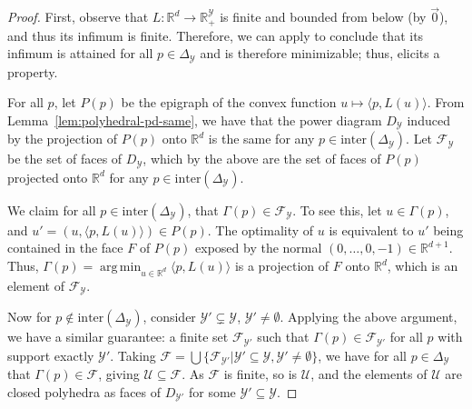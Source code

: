 \documentclass[11pt]{article}
\newcommand{\reals}{\mathbb{R}}
\newcommand{\simplex}{\Delta_\Y}
\newcommand{\F}{\mathcal{F}}
\newcommand{\U}{\mathcal{U}}
\newcommand{\Y}{\mathcal{Y}}
\newcommand{\inprod}[2]{\langle #1, #2 \rangle}%
\newcommand{\inter}{\mathrm{inter}}
\DeclareMathOperator*{\argmin}{arg\,min}
\begin{document}
\polyhedralrangegamma*
\begin{proof}
	First, observe that $L: \reals^d \to \reals^\Y_+$ is finite and bounded from below (by $\vec 0$), and thus its infimum is finite. 
	Therefore, we can apply \citet[Corollary 19.3.1]{rockafellar1997convex} to conclude that its infimum is attained for all $p \in \simplex$ and is therefore minimizable; thus, elicits a property.
	
	For all $p$, let $P(p)$ be the epigraph of the convex function $u\mapsto \inprod{p}{L(u)}$.
	From Lemma~\ref{lem:polyhedral-pd-same}, we have that the power diagram $D_\Y$ induced by the projection of $P(p)$ onto $\reals^d$ is the same for any $p\in\inter(\simplex)$.
	Let $\F_\Y$ be the set of faces of $D_\Y$, which by the above are the set of faces of $P(p)$ projected onto $\reals^d$ for any $p\in\inter(\simplex)$.
	
	We claim for all $p\in\inter(\simplex)$, that $\Gamma(p) \in \F_\Y$.
	To see this, let $u \in \Gamma(p)$, and $u' = (u,\inprod{p}{L(u)}) \in P(p)$.
	The optimality of $u$ is equivalent to $u'$ being contained in the face $F$ of $P(p)$ exposed by the normal $(0,\ldots,0,-1)\in\reals^{d+1}$.
	Thus, $\Gamma(p) = \argmin_{u\in\reals^d} \inprod{p}{L(u)}$ is a projection of $F$ onto $\reals^d$, which is an element of $\F_\Y$.
	
	Now for $p \not \in \inter(\simplex)$, consider $\Y'\subsetneq \Y$, $\Y'\neq\emptyset$.
	Applying the above argument, we have a similar guarantee: a finite set $\F_{\Y'}$ such that $\Gamma(p) \in \F_{\Y'}$ for all $p$ with support exactly $\Y'$.
	Taking $\F = \bigcup\{\F_{\Y'} | \Y'\subseteq\Y, \Y'\neq\emptyset\}$, we have for all $p\in\simplex$ that $\Gamma(p) \in \F$, giving $\U \subseteq \F$.
	As $\F$ is finite, so is $\U$, and the elements of $\U$ are closed polyhedra as faces of $D_{\Y'}$ for some $\Y'\subseteq\Y$.
\end{proof}
\end{document}
